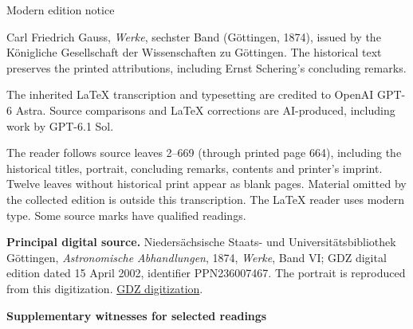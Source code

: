 \clearpage
\begingroup
\pagestyle{empty}
\thispagestyle{empty}
\normalfont\normalsize
\setlength{\parindent}{0pt}
\setlength{\parskip}{.65\baselineskip}
\begin{center}
{\Large Modern edition notice}
\end{center}

Carl Friedrich Gauss, \emph{Werke}, sechster Band (Göttingen, 1874), issued by the Königliche Gesellschaft der Wissenschaften zu Göttingen. The historical text preserves the printed attributions, including Ernst Schering's concluding remarks.

The inherited LaTeX transcription and typesetting are credited to OpenAI GPT-6 Astra. Source comparisons and LaTeX corrections are AI-produced, including work by GPT-6.1 Sol.

The reader follows source leaves 2--669 (through printed page 664), including the historical titles, portrait, concluding remarks, contents and printer's imprint. Twelve leaves without historical print appear as blank pages. Material omitted by the collected edition is outside this transcription. The LaTeX reader uses modern type. Some source marks have qualified readings.

\textbf{Principal digital source.} Niedersächsische Staats- und Universitätsbibliothek Göttingen, \emph{Astronomische Abhandlungen}, 1874, \emph{Werke}, Band VI; GDZ digital edition dated 15 April 2002, identifier PPN236007467. The portrait is reproduced from this digitization.
\href{https://resolver.sub.uni-goettingen.de/purl?PPN236007467}{GDZ digitization}.

\textbf{Supplementary witnesses for selected readings}

